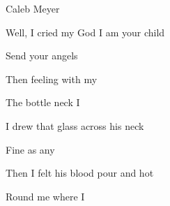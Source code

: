 \begin{SBSong}{Caleb Meyer}
\begin{SBVerse}
    Well, I cried my God I am your child

    Send your angels 

    Then feeling with my 

    The bottle neck I 

    I drew that glass across his neck

    Fine as any 

    Then I felt his blood pour  and hot

    Round me where I 
  \end{SBVerse}
\end{SBSong}
